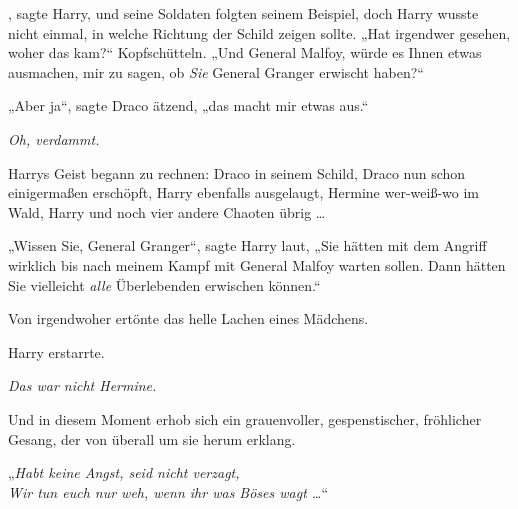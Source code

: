 , sagte Harry, und seine Soldaten folgten seinem Beispiel, doch Harry wusste nicht einmal, in welche Richtung der Schild zeigen sollte.
„Hat irgendwer gesehen, woher das kam?“ Kopfschütteln.
„Und General Malfoy, würde es Ihnen etwas ausmachen, mir zu sagen, ob \emph{Sie} General Granger erwischt haben?“

„Aber ja“, sagte Draco ätzend, „das macht mir etwas aus.“

\emph{Oh, verdammt.}

Harrys Geist begann zu rechnen: Draco in seinem Schild, Draco nun schon einigermaßen erschöpft, Harry ebenfalls ausgelaugt, Hermine wer-weiß-wo im Wald, Harry und noch vier andere Chaoten übrig …

„Wissen Sie, General Granger“, sagte Harry laut,
„Sie hätten mit dem Angriff wirklich bis nach meinem Kampf mit General Malfoy warten sollen. Dann hätten Sie vielleicht \emph{alle} Überlebenden erwischen können.“

Von irgendwoher ertönte das helle Lachen eines Mädchens.

Harry erstarrte.

\emph{Das war nicht Hermine.}

Und in diesem Moment erhob sich ein grauenvoller, gespenstischer, fröhlicher Gesang, der von überall um sie herum erklang.

„\emph{Habt keine Angst, seid nicht verzagt,\\
Wir tun euch nur weh, wenn ihr was Böses wagt …}“

